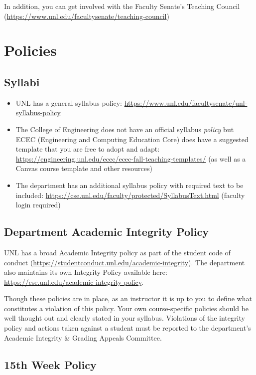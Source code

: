 \documentclass[12pt]{scrartcl}
\begin{document}
In addition, you can get involved with the Faculty Senate's
Teaching Council (\url{https://www.unl.edu/facultysenate/teaching-council})

\section{Policies}

\subsection{Syllabi}

\begin{itemize}
  \item UNL has a general syllabus policy: \url{https://www.unl.edu/facultysenate/unl-syllabus-policy}
  \item The College of Engineering does not have an official syllabus \emph{policy} but ECEC (Engineering and Computing Education Core) does have a suggested template that you are free to adopt and adapt: \url{https://engineering.unl.edu/ecec/ecec-fall-teaching-templates/} (as well as a Canvas course template and other resources)
  \item The department has an additional syllabus policy with required text to be included: 
\url{https://cse.unl.edu/faculty/protected/SyllabusText.html} (faculty login required) 
\end{itemize}
 
\subsection{Department Academic Integrity Policy}

UNL has a broad Academic Integrity policy as part of the
student code of conduct (\url{https://studentconduct.unl.edu/academic-integrity}).  The department also maintains its own Integrity
Policy available here: \url{https://cse.unl.edu/academic-integrity-policy}.

Though these policies are in place, as an instructor it is up
to you to define what constitutes a violation of this policy.
Your own course-specific policies should be well thought out and
clearly stated in your syllabus.  Violations of the integrity
policy and actions taken against a student must be reported to
the department's Academic Integrity \& Grading Appeals Committee.

\subsection{15th Week Policy}
\end{document}
